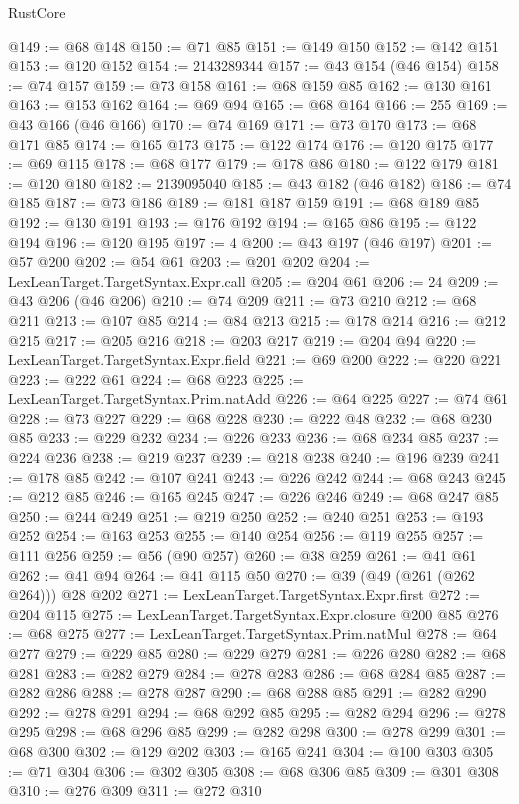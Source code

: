 \begin{lexlean}{RustCore}
\begin{coremodule}
@149 := @68 @148
@150 := @71 @85
@151 := @149 @150
@152 := @142 @151
@153 := @120 @152
@154 := 2143289344
@157 := @43 @154 (@46 @154)
@158 := @74 @157
@159 := @73 @158
@161 := @68 @159 @85
@162 := @130 @161
@163 := @153 @162
@164 := @69 @94
@165 := @68 @164
@166 := 255
@169 := @43 @166 (@46 @166)
@170 := @74 @169
@171 := @73 @170
@173 := @68 @171 @85
@174 := @165 @173
@175 := @122 @174
@176 := @120 @175
@177 := @69 @115
@178 := @68 @177
@179 := @178 @86
@180 := @122 @179
@181 := @120 @180
@182 := 2139095040
@185 := @43 @182 (@46 @182)
@186 := @74 @185
@187 := @73 @186
@189 := @181 @187 @159
@191 := @68 @189 @85
@192 := @130 @191
@193 := @176 @192
@194 := @165 @86
@195 := @122 @194
@196 := @120 @195
@197 := 4
@200 := @43 @197 (@46 @197)
@201 := @57 @200
@202 := @54 @61
@203 := @201 @202
@204 := LexLeanTarget.TargetSyntax.Expr.call
@205 := @204 @61
@206 := 24
@209 := @43 @206 (@46 @206)
@210 := @74 @209
@211 := @73 @210
@212 := @68 @211
@213 := @107 @85
@214 := @84 @213
@215 := @178 @214
@216 := @212 @215
@217 := @205 @216
@218 := @203 @217
@219 := @204 @94
@220 := LexLeanTarget.TargetSyntax.Expr.field
@221 := @69 @200
@222 := @220 @221
@223 := @222 @61
@224 := @68 @223
@225 := LexLeanTarget.TargetSyntax.Prim.natAdd
@226 := @64 @225
@227 := @74 @61
@228 := @73 @227
@229 := @68 @228
@230 := @222 @48
@232 := @68 @230 @85
@233 := @229 @232
@234 := @226 @233
@236 := @68 @234 @85
@237 := @224 @236
@238 := @219 @237
@239 := @218 @238
@240 := @196 @239
@241 := @178 @85
@242 := @107 @241
@243 := @226 @242
@244 := @68 @243
@245 := @212 @85
@246 := @165 @245
@247 := @226 @246
@249 := @68 @247 @85
@250 := @244 @249
@251 := @219 @250
@252 := @240 @251
@253 := @193 @252
@254 := @163 @253
@255 := @140 @254
@256 := @119 @255
@257 := @111 @256
@259 := @56 (@90 @257)
@260 := @38 @259
@261 := @41 @61
@262 := @41 @94
@264 := @41 @115 @50
@270 := @39 (@49 (@261 (@262 @264))) @28 @202
@271 := LexLeanTarget.TargetSyntax.Expr.first
@272 := @204 @115
@275 := LexLeanTarget.TargetSyntax.Expr.closure @200 @85
@276 := @68 @275
@277 := LexLeanTarget.TargetSyntax.Prim.natMul
@278 := @64 @277
@279 := @229 @85
@280 := @229 @279
@281 := @226 @280
@282 := @68 @281
@283 := @282 @279
@284 := @278 @283
@286 := @68 @284 @85
@287 := @282 @286
@288 := @278 @287
@290 := @68 @288 @85
@291 := @282 @290
@292 := @278 @291
@294 := @68 @292 @85
@295 := @282 @294
@296 := @278 @295
@298 := @68 @296 @85
@299 := @282 @298
@300 := @278 @299
@301 := @68 @300
@302 := @129 @202
@303 := @165 @241
@304 := @100 @303
@305 := @71 @304
@306 := @302 @305
@308 := @68 @306 @85
@309 := @301 @308
@310 := @276 @309
@311 := @272 @310

\end{coremodule}
\end{lexlean}
